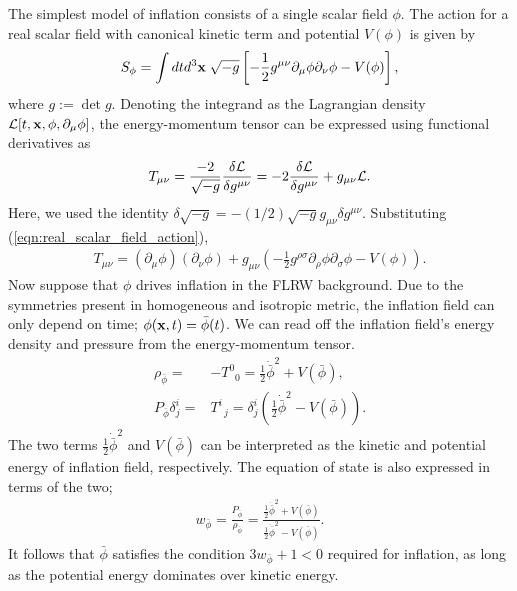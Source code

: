 The simplest model of inflation consists of a single scalar field $\phi$. The action for a real scalar field with canonical kinetic term and potential $V(\phi)$ is given by
\begin{align}
	S_\phi = \int dt d^3 \mathbf{x} \; \sqrt{-g} \left[ -\frac{1}{2} g^{\mu\nu} \partial_\mu \phi \partial_\nu \phi - V(\phi) \right],		\label{eqn:real_scalar_field_action}
\end{align}
where $g:=\det g$. Denoting the integrand as the Lagrangian density $\mathcal{L}[t, \mathbf{x}, \phi, \partial_\mu \phi]$, the energy-momentum tensor can be expressed using functional derivatives as
\begin{align}
	T_{\mu\nu} = \frac{-2}{\sqrt{-g}} \frac{\delta\mathcal{L}}{\delta g^{\mu\nu}} = -2 \frac{\delta \mathcal{L}}{\delta g^{\mu\nu}} + g_{\mu\nu} \mathcal{L}.
\end{align}
Here, we used the identity $\delta\sqrt{-g} = -(1/2) \sqrt{-g} g_{\mu\nu} \delta g^{\mu\nu}$. Substituting (\ref{eqn:real_scalar_field_action}),
\begin{align}
	T_{\mu\nu} = \left( \partial_\mu \phi \right) \left( \partial_\nu \phi \right) + g_{\mu\nu} \left( -\frac{1}{2} g^{\rho\sigma} \partial_\rho \phi \partial_\sigma \phi - V(\phi) \right).
\end{align}
Now suppose that $\phi$ drives inflation in the FLRW background. Due to the symmetries present in homogeneous and isotropic metric, the inflation field can only depend on time; $\phi(\mathbf{x}, t) = \bar{\phi}(t)$. We can read off the inflation field's energy density and pressure from the energy-momentum tensor.
\begin{align}
	\rho_{\bar{\phi}} =& -T^0_{\;\;0} = \frac{1}{2} \dot{\bar{\phi}}^2 + V(\bar{\phi}),	\\
	P_{\bar{\phi}} \delta^i_j =& T^i_{\;\;j} = \delta^i_j \left( \frac{1}{2} \dot{\bar{\phi}}^2 - V(\bar{\phi}) \right).
\end{align}
The two terms $\frac{1}{2} \dot{\bar{\phi}}^2$ and $V(\bar{\phi})$ can be interpreted as the kinetic and potential energy of inflation field, respectively. The equation of state is also expressed in terms of the two;
\begin{align}
	w_{\bar{\phi}} = \frac{P_{\bar{\phi}}}{\rho_{\bar{\phi}}} = \frac{\frac{1}{2} \dot{\bar{\phi}}^2 + V(\bar{\phi})}{\frac{1}{2} \dot{\bar{\phi}}^2 - V(\bar{\phi})}.
\end{align}
It follows that $\bar{\phi}$ satisfies the condition $3w_{\bar{\phi}}+1<0$ required for inflation, as long as the potential energy dominates over kinetic energy.

